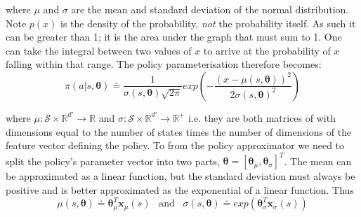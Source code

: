 where $\mu$ and $\sigma$ are the mean and standard deviation of the normal distribution. Note $p(x)$ is the density of the probability, \textit{not} the probability itself. As such it can be greater than 1; it is the area under the graph that must sum to 1. One can take the integral between two values of $x$ to arrive at the probability of $x$ falling within that range. The policy parameterisation therefore becomes:
\begin{equation}
\pi(a | s, \boldsymbol{\theta}) \doteq \frac{1}{\sigma(s, \boldsymbol{\theta}) \sqrt{2 \pi}}exp\left(-\frac{(x - \mu(s, \boldsymbol{\theta}))^2}{2 \sigma(s, \boldsymbol{\theta})^2}\right)
\end{equation}

where $\mu : \mathcal{S} \times \mathbb{R}^{d'} \rightarrow \mathbb{R}$ and $\sigma : \mathcal{S} \times \mathbb{R}^{d'} \rightarrow \mathbb{R^+}$ i.e. they are both matrices of with dimensions equal to the number of states times the number of dimensions of the feature vector defining the policy. To from the policy approximator we need to split the policy's parameter vector into two parts, $\boldsymbol{\theta} = [\boldsymbol{\theta}_\mu, \boldsymbol{\theta}_\sigma]^T$. The mean can be approximated as a linear function, but the standard deviation must always be positive and is better approximated as the exponential of a linear function. Thus
\begin{equation}
\mu(s, \boldsymbol{\theta}) \doteq \boldsymbol{\theta}_\mu^T \textbf{x}_\mu(s) \; \; \; \text{and} \; \; \; \sigma(s, \boldsymbol{\theta}) \doteq exp\left(\boldsymbol{\theta}_\sigma^T \textbf{x}_\sigma(s)\right)
\end{equation}

